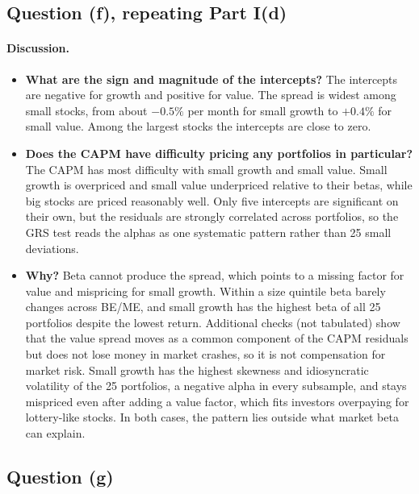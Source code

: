 \subsection{Question (f), repeating Part I(d)}

\paragraph{Discussion.}
\begin{itemize}
\setlength{\itemsep}{4pt}\setlength{\parskip}{0pt}

\item \textbf{What are the sign and magnitude of the intercepts?} The
intercepts are negative for growth and positive for value. The spread is widest among small stocks, from about $-0.5\%$ per
month for small growth to $+0.4\%$ for small value. Among the largest
stocks the intercepts are close to zero.

\item \textbf{Does the CAPM have difficulty pricing any portfolios in
particular?} The CAPM has most difficulty with small growth and small value.
Small growth is overpriced and small value underpriced relative to
their betas, while big stocks are priced reasonably well. Only five
intercepts are significant on their own, but the residuals are strongly
correlated across portfolios, so the GRS test reads the alphas as one
systematic pattern rather than 25 small deviations.

\item \textbf{Why?} Beta cannot produce the spread, which points to a
missing factor for value and mispricing for small growth. Within a size quintile
beta barely changes across BE/ME, and small growth has the highest beta of
all 25 portfolios despite the lowest return. Additional checks (not tabulated) show that the value spread moves as a common component of the CAPM residuals but does not lose money in market crashes, so it is not compensation for market risk. Small growth has
the highest skewness and idiosyncratic volatility of the 25 portfolios, a
negative alpha in every subsample, and stays mispriced even after adding a
value factor, which fits investors overpaying for lottery-like stocks. In both cases, the pattern lies outside what market beta can explain.

\end{itemize}

\subsection{Question (g)}

